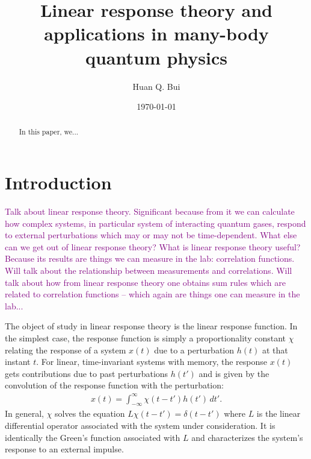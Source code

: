 \documentclass[reprint,
nofootinbib,
amsmath,amssymb,
aps]{revtex4-1}
\begin{document}
	
	

\title{Linear response theory and applications in many-body quantum physics}
\author{Huan Q. Bui}
\date{\today}


\begin{abstract}
	In this paper, we...
\end{abstract}

\maketitle


\section{Introduction}
\textcolor{purple}{Talk about linear response theory. Significant because from it we can calculate how complex systems, in particular system of interacting quantum gases, respond to external perturbations which may or may not be time-dependent. What else can we get out of linear response theory? What is linear response theory useful? Because its results are things we can measure in the lab: correlation functions. Will talk about the relationship between measurements and correlations. Will talk about how from linear response theory one obtains sum rules which are related to correlation functions -- which again are things one can measure in the lab... }

The object of study in linear response theory is the linear response function. In the simplest case, the response function is simply a proportionality constant $\chi$ relating the response of a system $x(t)$ due to a perturbation $h(t)$ at that instant $t$. For linear, time-invariant systems with memory, the response $x(t)$ gets contributions due to past perturbations $h(t')$ and is given by the convolution of the response function with the perturbation:
\begin{align}\label{eq:linear_response}
x(t) = \int_{-\infty}^{\infty} \chi(t-t') h(t') \,dt'.
\end{align}
In general, $\chi$ solves the equation $ L \chi(t-t') = \delta(t-t')$ where $L$ is the linear differential operator associated with the system under consideration. It is identically the Green's function associated with $L$ and characterizes the system's response to an external impulse. 
\end{document}
